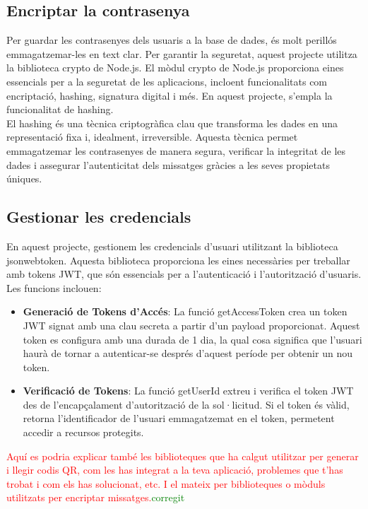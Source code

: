 \documentclass[a4paper,12pt,twoside]{ThesisStyle}
\newcommand{\pau}[1]{\textcolor{red}{#1}}
\newcommand{\sudan}[1]{\textcolor{green}{#1}}
\begin{document}
\subsection{Encriptar la contrasenya}
\label{subsec: Encriptar la contrasenya}

Per guardar les contrasenyes dels usuaris a la base de dades, és molt perillós emmagatzemar-les en text clar. Per garantir la seguretat, aquest projecte utilitza la biblioteca crypto de Node.js. El mòdul crypto de Node.js proporciona eines essencials per a la seguretat de les aplicacions, incloent funcionalitats com encriptació, hashing, signatura digital i més. En aquest projecte, s'empla la funcionalitat de hashing.\\

El hashing és una tècnica criptogràfica clau que transforma les dades en una representació fixa i, idealment, irreversible. Aquesta tècnica permet emmagatzemar les contrasenyes de manera segura, verificar la integritat de les dades i assegurar l'autenticitat dels missatges gràcies a les seves propietats úniques.


\subsection{Gestionar les credencials}
\label{subsec: Gestionar les credencials}


En aquest projecte, gestionem les credencials d'usuari utilitzant la biblioteca jsonwebtoken. Aquesta biblioteca proporciona les eines necessàries per treballar amb tokens JWT, que són essencials per a l'autenticació i l'autorització d'usuaris. Les funcions inclouen:

\begin{itemize}
    \item \textbf{Generació de Tokens d'Accés}: La funció getAccessToken crea un token JWT signat amb una clau secreta a partir d'un payload proporcionat. Aquest token es configura amb una durada de 1 dia, la qual cosa significa que l'usuari haurà de tornar a autenticar-se després d'aquest període per obtenir un nou token.
    \item \textbf{Verificació de Tokens}: La funció getUserId extreu i verifica el token JWT des de l'encapçalament d'autorització de la sol·licitud. Si el token és vàlid, retorna l'identificador de l'usuari emmagatzemat en el token, permetent accedir a recursos protegits.
\end{itemize}


\pau{Aquí es podria explicar també les biblioteques que ha calgut utilitzar per generar i llegir codis QR, com les has integrat a la teva aplicació, problemes que t'has trobat i com els has solucionat, etc. I el mateix per biblioteques o mòduls utilitzats per encriptar missatges.}\sudan{corregit}
\end{document}
